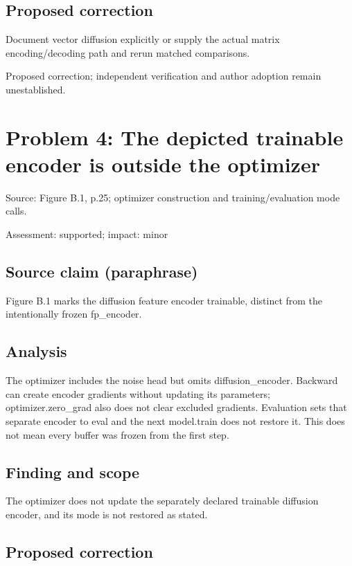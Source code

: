 \documentclass[11pt]{article}
\begin{document}
\subsection*{Proposed correction}

Document vector diffusion explicitly or supply the actual matrix encoding/decoding path and rerun matched comparisons.

Proposed correction; independent verification and author adoption remain unestablished.

\section*{Problem 4: The depicted trainable encoder is outside the optimizer}

Source: Figure B.1, p.25; optimizer construction and training/evaluation mode calls.

Assessment: supported; impact: minor

\subsection*{Source claim (paraphrase)}

Figure B.1 marks the diffusion feature encoder trainable, distinct from the intentionally frozen fp\_encoder.

\subsection*{Analysis}

The optimizer includes the noise head but omits diffusion\_encoder. Backward can create encoder gradients without updating its parameters; optimizer.zero\_grad also does not clear excluded gradients. Evaluation sets that separate encoder to eval and the next model.train does not restore it. This does not mean every buffer was frozen from the first step.

\subsection*{Finding and scope}

The optimizer does not update the separately declared trainable diffusion encoder, and its mode is not restored as stated.

\subsection*{Proposed correction}
\end{document}
